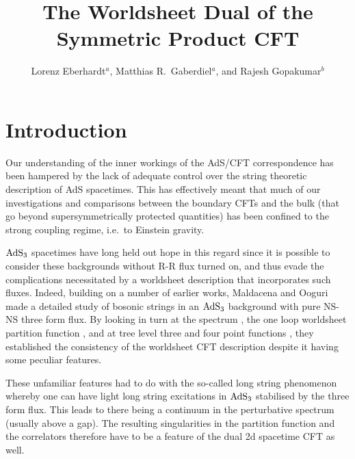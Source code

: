 \documentclass[12pt,a4paper]{article}
\title{The Worldsheet Dual of the Symmetric Product CFT}
\author{Lorenz Eberhardt$^a$, Matthias R.\ Gaberdiel$^a$, and Rajesh Gopakumar$^b$}
\affiliation{$^a$ Institut f\"ur Theoretische Physik, ETH Zurich, \\
\hspace*{0.3cm}CH-8093 Z\"urich, Switzerland}
\affiliation{$^b$ International Centre for Theoretical Sciences-TIFR, \\
\hspace*{0.3cm}Shivakote, Hesaraghatta Hobli, \\
\hspace*{0.3cm}Bengaluru North, India 560 089}
\begin{document}

\maketitle



\makeatletter
\g@addto@macro\bfseries{\boldmath}
\makeatother


\section{Introduction} \label{sec:intro}

Our understanding of the inner workings of the AdS/CFT correspondence 
has been hampered by the lack of adequate control over the string theoretic description of AdS spacetimes. This has effectively meant that much of our investigations and comparisons between the boundary CFTs  and the bulk (that go beyond supersymmetrically protected quantities) has been confined to the strong coupling regime, i.e.\ to Einstein gravity.

${\rm AdS}_3$ spacetimes have long held out hope in this regard since it is possible to consider these backgrounds without R-R flux turned on, and thus evade the complications necessitated by a worldsheet description that incorporates such fluxes. Indeed, building on a number of earlier works, 
Maldacena and Ooguri made a detailed study of bosonic strings in an ${\rm AdS}_3$ background with pure NS-NS three form flux. By looking in turn at the spectrum \cite{Maldacena:2000hw}, the one loop worldsheet partition function \cite{Maldacena:2000kv}, and at tree level three and four point functions \cite{Maldacena:2001km}, they established the consistency of the worldsheet CFT description despite it having some peculiar  features. 

These unfamiliar features had to do with the so-called long string phenomenon whereby one can have light long string excitations in ${\rm AdS}_3$ stabilised by the three form flux. This leads to there being a continuum in the perturbative spectrum (usually above a gap). The resulting singularities in the partition function and the correlators therefore have to be a feature of the dual 2d spacetime CFT as well. 
\end{document}
